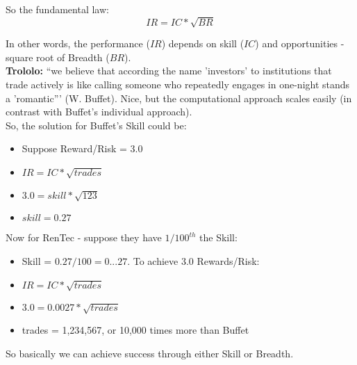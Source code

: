 \documentclass{scrartcl}
\begin{document}
So the fundamental law:
$$IR = IC * \sqrt{BR}$$

In other words, the performance ($IR$) depends on skill ($IC$) and opportunities
- square root of Breadth ($BR$).\\

{\bf Trololo:} ``we believe that according the name 'investors' to institutions that
trade actively is like calling someone who repeatedly engages in one-night
stands a 'romantic''' (W. Buffet). Nice, but the computational approach scales
easily (in contrast with Buffet's individual approach). \\
So, the solution for Buffet's Skill could be:
\begin{itemize}
\item Suppose Reward/Risk = 3.0
\item $IR = IC * \sqrt{trades}$
\item $3.0 = skill * \sqrt{123}$
\item $skill = 0.27$
\end{itemize}
Now for RenTec - suppose they have $1/100^{th}$ the Skill:
\begin{itemize}
\item Skill = $0.27/100 = 0...27$. To achieve 3.0 Rewards/Risk:
\item $IR = IC * \sqrt{trades}$
\item $3.0 = 0.0027 * \sqrt{trades}$
\item trades = 1,234,567, or 10,000 times more than Buffet
\end{itemize}
So basically we can achieve success through either Skill or Breadth. 
\end{document}
